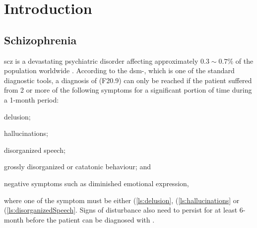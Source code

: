 	\chapter{Introduction}
	\section{Schizophrenia}
	\Gls{scz} is a devastating psychiatric disorder affecting approximately $0.3\sim0.7\%$ of the population worldwide \citep{AmericanPsychiatricAssociation2013}.
	According to the \gls{dsm}-, which is one of the standard diagnostic tools, a diagnosis of  (F20.9) can only be reached if the patient suffered from 2 or more of the following symptoms for a significant portion of time during a 1-month period: 
	\begin{enumerate*}[label=\arabic*\upshape)]
		\item delusion; \label{ls:delusion}
		\item hallucinations;\label{ls:hallucinations}
		\item disorganized speech;\label{ls:disorganizedSpeech}
		\item grossly disorganized or catatonic behaviour; and\label{ls:catatonicBehavior}
		\item negative symptoms such as diminished emotional expression,\label{ls:negativeSymptoms}
	\end{enumerate*}  where one of the symptom must be either (\ref{ls:delusion}, (\ref{ls:hallucinations} or (\ref{ls:disorganizedSpeech}.
	Signs of disturbance also need to persist for at least 6-month before the patient can be diagnosed with .
	
